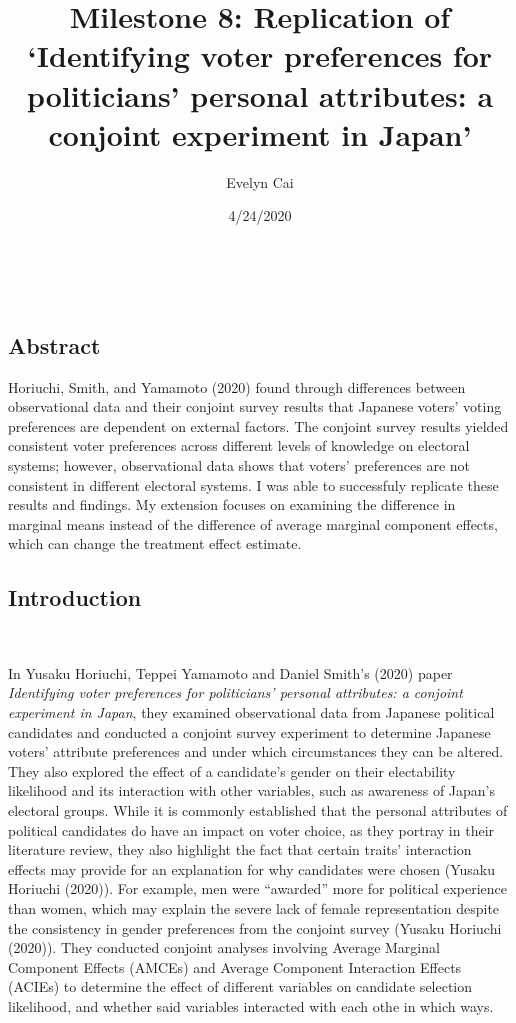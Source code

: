 \documentclass[
]{article}
\title{Milestone 8: Replication of `Identifying voter preferences for politicians' personal attributes: a conjoint experiment in Japan'}
\author{Evelyn Cai}
\date{4/24/2020}
\begin{document}
\maketitle

{
\setcounter{tocdepth}{2}
\tableofcontents
}
~

\hypertarget{abstract}{%
\subsection{Abstract}\label{abstract}}

Horiuchi, Smith, and Yamamoto (2020) found through differences between observational data and their conjoint survey results that Japanese voters' voting preferences are dependent on external factors. The conjoint survey results yielded consistent voter preferences across different levels of knowledge on electoral systems; however, observational data shows that voters' preferences are not consistent in different electoral systems. I was able to successfuly replicate these results and findings. My extension focuses on examining the difference in marginal means instead of the difference of average marginal component effects, which can change the treatment effect estimate.

\pagebreak

\hypertarget{introduction}{%
\subsection{Introduction}\label{introduction}}

~

In Yusaku Horiuchi, Teppei Yamamoto and Daniel Smith's (2020) paper \emph{Identifying voter preferences for politicians' personal attributes: a conjoint experiment in Japan}, they examined observational data from Japanese political candidates and conducted a conjoint survey experiment to determine Japanese voters' attribute preferences and under which circumstances they can be altered. They also explored the effect of a candidate's gender on their electability likelihood and its interaction with other variables, such as awareness of Japan's electoral groups. While it is commonly established that the personal attributes of political candidates do have an impact on voter choice, as they portray in their literature review, they also highlight the fact that certain traits' interaction effects may provide for an explanation for why candidates were chosen (Yusaku Horiuchi (2020)). For example, men were ``awarded'' more for political experience than women, which may explain the severe lack of female representation despite the consistency in gender preferences from the conjoint survey (Yusaku Horiuchi (2020)). They conducted conjoint analyses involving Average Marginal Component Effects (AMCEs) and Average Component Interaction Effects (ACIEs) to determine the effect of different variables on candidate selection likelihood, and whether said variables interacted with each othe in which ways.
\end{document}
